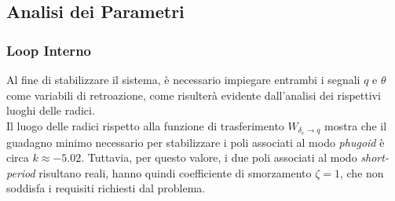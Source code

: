 \subsection{Analisi dei Parametri}

\subsubsection{Loop Interno}

Al fine di stabilizzare il sistema, è necessario impiegare entrambi i segnali $q$ e $\theta$ come variabili di retroazione, come risulterà evidente dall'analisi dei rispettivi luoghi delle radici.
\\[10pt]
Il luogo delle radici rispetto alla funzione di trasferimento $W_{\delta_e \rightarrow q}$ mostra che il guadagno minimo necessario per stabilizzare i poli associati al modo \textit{phugoid} è circa $k \approx -5.02$. Tuttavia, per questo valore, i due poli associati al modo \textit{short-period} risultano reali, hanno quindi coefficiente di smorzamento $\zeta = 1$, che non soddisfa i requisiti richiesti dal problema.

